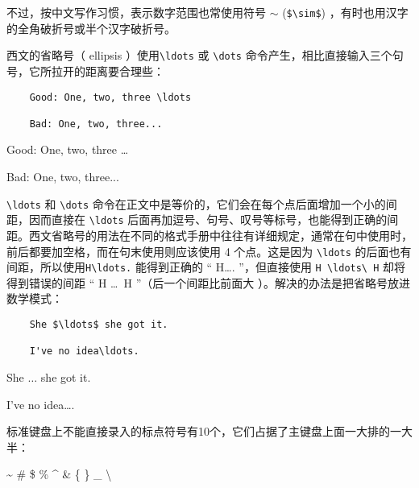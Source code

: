 不过，按中文写作习惯，表示数字范围也常使用符号 $\sim$ (\verb|$\sim$|) ，有时也用汉字的全角破折号或半个汉字破折号。

西文的省略号（ ellipsis ）使用\verb|\ldots| 或 \verb|\dots| 命令产生，相比直接输入三个句号，它所拉开的距离要合理些：

\begin{minipage}[t]{0.45\textwidth}
    \begin{lstlisting}
    Good: One, two, three \ldots

    Bad: One, two, three...
    \end{lstlisting}
\end{minipage}
\hfill
\begin{minipage}[t]{0.45\textwidth}
    \vspace{0.1cm}
    \hspace{0.5cm}

    Good: One, two, three \ldots

    Bad: One, two, three...
\end{minipage}

\verb|\ldots| 和 \verb|\dots| 命令在正文中是等价的，它们会在每个点后面增加一个小的间距，因而直接在 \verb|\ldots| 后面再加逗号、句号、叹号等标号，也能得到正确的间距。西文省略号的用法在不同的格式手册中往往有详细规定，通常在句中使用时，前后都要加空格，而在句末使用则应该使用 4 个点。这是因为 \verb|\ldots| 的后面也有间距，所以使用\verb|H\ldots.| 能得到正确的 “ H\ldots. ”，但直接使用 \verb|H \ldots\ H| 却将得到错误的间距 “ H \ldots\ H ”（后一个间距比前面大 ）。解决的办法是把省略号放进数学模式：

\begin{minipage}[t]{0.45\textwidth}
    \begin{lstlisting}
    She $\ldots$ she got it.

    I've no idea\ldots.
    \end{lstlisting}
\end{minipage}
\hfill
\begin{minipage}[t]{0.45\textwidth}
    \vspace{0.1cm}
    \hspace{0.5cm}

    She $\ldots$ she got it.

    I've no idea\ldots.
\end{minipage}

标准键盘上不能直接录入的标点符号有10个，它们占据了主键盘上面一大排的一大半：

\~{} \quad \# \quad \$ \quad \% \quad \^{} \quad \& \quad \{ \quad \} \quad \_ \quad \textbackslash 

